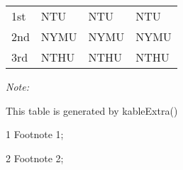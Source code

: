 \begin{table}
\begin{threeparttable}
\begin{tabular}[t]{llll}
\hspace{1em}1st & NTU & NTU & NTU\\
\hspace{1em}2nd & NYMU & NYMU & NYMU\\
\hspace{1em}3rd & NTHU & NTHU & NTHU\\
\bottomrule
\end{tabular}
\begin{tablenotes}
\item \textit{Note: } 
\item This table is generated by kableExtra()
\item[1] Footnote 1; 
\item[2] Footnote 2; 
\end{tablenotes}
\end{threeparttable}
\end{table}
